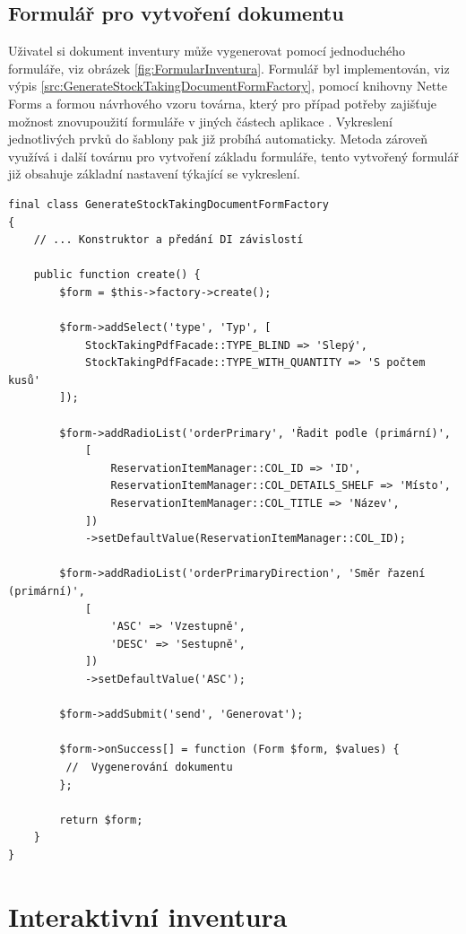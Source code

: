 \subsection{Formulář pro vytvoření dokumentu}

Uživatel si dokument inventury může vygenerovat pomocí jednoduchého formuláře, viz obrázek \ref{fig:FormularInventura}. Formulář byl implementován, viz výpis \ref{src:GenerateStockTakingDocumentFormFactory}, pomocí knihovny Nette Forms a formou návrhového vzoru továrna, který pro případ potřeby zajišťuje možnost znovupoužití formuláře v jiných částech aplikace \cite{refactoringFactoryMethod}.
Vykreslení jednotlivých prvků do šablony pak již probíhá automaticky. Metoda zároveň využívá i další továrnu pro vytvoření základu formuláře, tento vytvořený formulář již obsahuje základní nastavení týkající se vykreslení. 

\begin{lstlisting}[caption={Továrna formuláře pro generování dokumentu s inventurou}, label={src:GenerateStockTakingDocumentFormFactory}]
final class GenerateStockTakingDocumentFormFactory
{
    // ... Konstruktor a předání DI závislostí

    public function create() {
		$form = $this->factory->create();

		$form->addSelect('type', 'Typ', [
            StockTakingPdfFacade::TYPE_BLIND => 'Slepý',
            StockTakingPdfFacade::TYPE_WITH_QUANTITY => 'S počtem kusů'
        ]);

        $form->addRadioList('orderPrimary', 'Řadit podle (primární)',
            [
                ReservationItemManager::COL_ID => 'ID',
                ReservationItemManager::COL_DETAILS_SHELF => 'Místo',
                ReservationItemManager::COL_TITLE => 'Název',
            ])
            ->setDefaultValue(ReservationItemManager::COL_ID);

        $form->addRadioList('orderPrimaryDirection', 'Směr řazení (primární)',
            [
                'ASC' => 'Vzestupně',
                'DESC' => 'Sestupně',
            ])
            ->setDefaultValue('ASC');

		$form->addSubmit('send', 'Generovat');

		$form->onSuccess[] = function (Form $form, $values) {
         //  Vygenerování dokumentu
		};

		return $form;
	}
}
\end{lstlisting}

\section{Interaktivní inventura}


